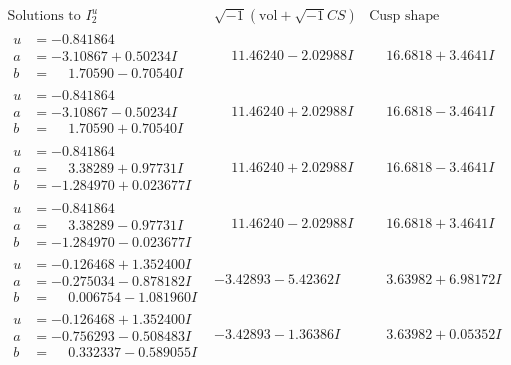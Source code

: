 \documentclass[1p]{elsarticle_modified}
\theoremstyle{definition}
\newcommand{\I}{\sqrt{-1}}
\begin{document}
$$\begin{array}{c|c|c}  
\text{Solutions to }I^u_{2}& \I (\text{vol} + \sqrt{-1}CS) & \text{Cusp shape}\\
 \hline 
\begin{aligned}
u &= -0.841864\phantom{ +0.000000I} \\
a &= -3.10867 + 0.50234 I \\
b &= \phantom{-}1.70590 - 0.70540 I\end{aligned}
 & \phantom{-}11.46240 - 2.02988 I & \phantom{-}16.6818 + 3.4641 I \\ \hline\begin{aligned}
u &= -0.841864\phantom{ +0.000000I} \\
a &= -3.10867 - 0.50234 I \\
b &= \phantom{-}1.70590 + 0.70540 I\end{aligned}
 & \phantom{-}11.46240 + 2.02988 I & \phantom{-}16.6818 - 3.4641 I \\ \hline\begin{aligned}
u &= -0.841864\phantom{ +0.000000I} \\
a &= \phantom{-}3.38289 + 0.97731 I \\
b &= -1.284970 + 0.023677 I\end{aligned}
 & \phantom{-}11.46240 + 2.02988 I & \phantom{-}16.6818 - 3.4641 I \\ \hline\begin{aligned}
u &= -0.841864\phantom{ +0.000000I} \\
a &= \phantom{-}3.38289 - 0.97731 I \\
b &= -1.284970 - 0.023677 I\end{aligned}
 & \phantom{-}11.46240 - 2.02988 I & \phantom{-}16.6818 + 3.4641 I \\ \hline\begin{aligned}
u &= -0.126468 + 1.352400 I \\
a &= -0.275034 - 0.878182 I \\
b &= \phantom{-}0.006754 - 1.081960 I\end{aligned}
 & -3.42893 - 5.42362 I & \phantom{-}3.63982 + 6.98172 I \\ \hline\begin{aligned}
u &= -0.126468 + 1.352400 I \\
a &= -0.756293 - 0.508483 I \\
b &= \phantom{-}0.332337 - 0.589055 I\end{aligned}
 & -3.42893 - 1.36386 I & \phantom{-}3.63982 + 0.05352 I \\ \hline\begin{aligned}

\end{aligned}
\end{array}$$
\end{document}
